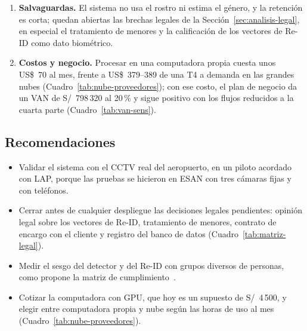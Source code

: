 \begin{enumerate}
    cámara, identidad seudónima, trayectoria y evento sin imágenes. La
    memoria de identidades del en vivo sí guarda vectores de apariencia,
    que se borran a las 24~horas sin ver a la persona; los puntos crudos se
    borran a los 90 días y quedan solo los agregados.
    \item \textbf{Salvaguardas.} El sistema no usa el rostro ni estima el
    género, y la retención es corta; quedan abiertas las brechas legales
    de la Sección~\ref{sec:analisis-legal}, en especial el tratamiento de
    menores y la calificación de los vectores de Re-ID como dato
    biométrico.
    \item \textbf{Costos y negocio.} Procesar en una computadora propia
    cuesta unos US\$~70 al mes, frente a US\$~379--389 de una T4 a demanda
    en las grandes nubes (Cuadro~\ref{tab:nube-proveedores}); con ese costo,
    el plan de negocio da un VAN de S/~798\,320 al 20\,\% y sigue positivo
    con los flujos reducidos a la cuarta parte (Cuadro~\ref{tab:van-sens}).
\end{enumerate}

\subsection{Recomendaciones}

\begin{itemize}
    \item Validar el sistema con el CCTV real del aeropuerto, en un piloto
    acordado con LAP, porque las pruebas se hicieron en ESAN con tres
    cámaras fijas y con teléfonos.
    \item Cerrar antes de cualquier despliegue las decisiones legales
    pendientes: opinión legal sobre los vectores de Re-ID, tratamiento de
    menores, contrato de encargo con el cliente y registro del banco de
    datos (Cuadro~\ref{tab:matriz-legal}).
    \item Medir el sesgo del detector y del Re-ID con grupos diversos de
    personas, como propone la matriz de cumplimiento~\cite{matrices2026}.
    \item Cotizar la computadora con GPU, que hoy es un supuesto de
    S/~4\,500, y elegir entre computadora propia y nube según las horas de
    uso al mes (Cuadro~\ref{tab:nube-proveedores}).
\end{itemize}
